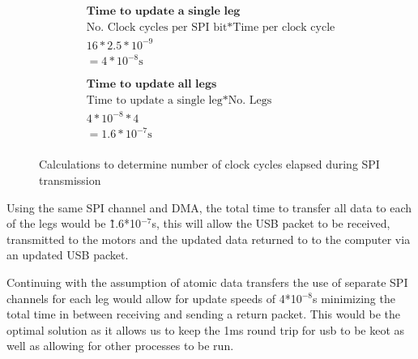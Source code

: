 \begin{figure}[!t]
\begin{minipage}{0.5\textwidth}
\begin{gather*}
                \\
                \textbf{Time to update a single leg}\\
                \text{No. Clock cycles per SPI bit} * \text{Time per clock cycle}\\
                16 * 2.5*10^{-9}\\
                =4*10^{-8}\text{s}\\
                \\
                \\
                \textbf{Time to update all legs}\\
                \text{Time to update a single leg} * \text{No. Legs}\\
                4*10^{-8}* 4\\
                =1.6*10^{-7}\text{s}\\
            \end{gather*}  
        \end{minipage}
        \caption{Calculations to determine number of clock cycles elapsed during SPI transmission}
        \label{fig:SPIClockCycles}
        \end{figure}

        Using the same SPI channel and DMA, the total time to transfer all data to each of the legs would be \~ 1.6*10$^{-7}$s, this will allow the USB packet to be received, transmitted to the motors and the updated data returned to to the computer via an updated USB packet. \newline
    
    Continuing with the assumption of atomic data transfers the use of separate SPI channels for each leg would allow for update speeds of 4*10$^{-8}$s minimizing the total time in between receiving and sending a return packet. This would be the optimal solution as it allows us to keep the 1ms round trip for usb to be keot as well as allowing for other processes to be run.  
    
